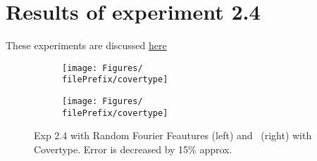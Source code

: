 
\newcommand{\major}{2}
\newcommand{\minor}{4}

\newcommand{\undPrefix}{\major_\minor}
\newcommand{\dotPrefix}{\major.\minor}
\newcommand{\scoPrefix}{\major-\minor}
\newcommand{\filePrefix}{\undPrefix/rff}

\chapter{Results of experiment \dotPrefix} %


\label{Appendix\scoPrefix} %

These experiments are discussed \hyperref[disc:h2]{here}



\begin{figure}[H]
  \centering
  \renewcommand{\filePrefix}{\undPrefix/rff}
  \begin{subfigure}[t]{0.5\linewidth}
    \centering\captionsetup{width=.8\linewidth}\texttt{[image: Figures/\\filePrefix/covertype]}
    \label{fig:\undPrefix_covertype}
  \end{subfigure}%
  \renewcommand{\filePrefix}{\undPrefix/nys}%
  \begin{subfigure}[t]{0.5\linewidth}
    \centering\captionsetup{width=.8\linewidth}\texttt{[image: Figures/\\filePrefix/covertype]}
    \label{fig:\undPrefix_covertype}
  \end{subfigure}%
  \caption*{Exp 2.4 with Random Fourier Feautures (left) and \Nys\ (right) with Covertype. Error is decreased by 15\% approx.}
\end{figure}


